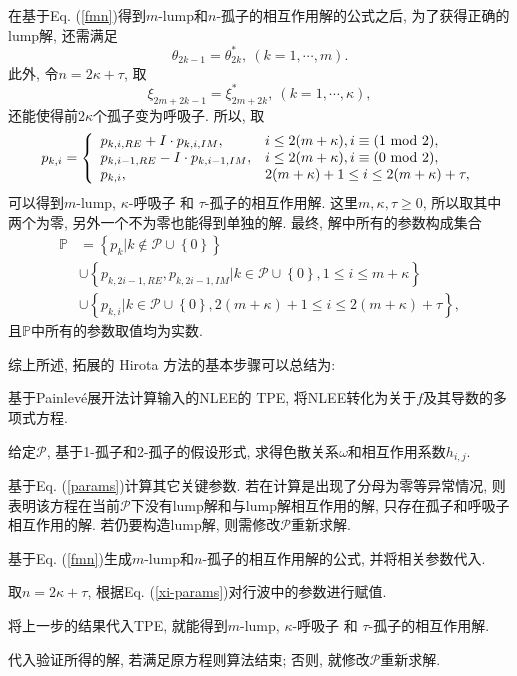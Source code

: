 \documentclass[12pt,a4paper,UTF8]{article}
\numberwithin{equation}{section}
\newcommand{\bbrace}[1]{\left\{#1\right\}}
\newcommand{\PS}{\mathcal{P}}
\renewcommand{\mod}{{\rm ~mod~}}
\newcommand{\Painleve}{Painlev{\'e}}
\newcommand{\refeqn}[1]{Eq. (\ref{#1})}
\newcommand{\MLNS}{$m$-lump和$n$-孤子的相互作用解}
\begin{document}
在基于\refeqn{fmn}得到\MLNS{}的公式之后, 为了获得正确的lump解, 还需满足
\begin{equation}
  \theta_{2k-1}=\theta_{2k}^*, ~(k=1,\cdots,m).
\end{equation}
此外, 令$n=2\kappa+\tau$, 取
\begin{equation}
  \xi_{2m+2k-1}=\xi_{2m+2k}^*, ~(k=1,\cdots,\kappa),
\end{equation}
还能使得前$2\kappa$个孤子变为呼吸子. 所以, 取
\begin{equation}
p_{k,i}=\left\{
\begin{array}{ll}
  p_{k,i,RE}+I\cdot p_{k,i,IM}, & i\le 2(m+\kappa), i\equiv(1 \mod 2),\\
  p_{k,i-1,RE}-I\cdot p_{k,i-1,IM}, & i\le 2(m+\kappa), i\equiv(0 \mod 2),\\
  p_{k,i}, & 2(m+\kappa)+1 \le i \le 2(m+\kappa)+\tau ,
\end{array}
\right.
\end{equation}
可以得到$m$-lump, $\kappa$-呼吸子 和 $\tau$-孤子的相互作用解. 这里$m,\kappa,\tau\ge 0$, 所以取其中两个为零, 另外一个不为零也能得到单独的解. 最终, 解中所有的参数构成集合
\begin{equation}
\begin{aligned}
\mathbb{P}
&=\bbrace{p_k|k\not\in \PS\cup\bbrace{0}} \\
&\cup\bbrace{p_{k,2i-1,RE},p_{k,2i-1,IM}|k\in\PS\cup\bbrace{0},1\le i \le m+\kappa} \\
&\cup\bbrace{p_{k,i}|k\in\PS\cup\bbrace{0},2(m+\kappa)+1 \le i \le 2(m+\kappa)+\tau},
\end{aligned}
\label{xi-params}
\end{equation}
且$\mathbb P$中所有的参数取值均为实数. 

综上所述, 拓展的 Hirota 方法的基本步骤可以总结为: 
\begin{compactenum}[Step 1.]
\item 基于\Painleve{}展开法计算输入的NLEE的 TPE, 将NLEE转化为关于$f$及其导数的多项式方程. 
\item 给定$\PS$, 基于1-孤子和2-孤子的假设形式, 求得色散关系$\omega$和相互作用系数$h_{i,j}$.
\item 基于\refeqn{params}计算其它关键参数. 若在计算是出现了分母为零等异常情况, 则表明该方程在当前$\PS$下没有lump解和与lump解相互作用的解, 只存在孤子和呼吸子相互作用的解. 若仍要构造lump解, 则需修改$\PS$重新求解. 
\item 基于\refeqn{fmn}生成\MLNS{}的公式, 并将相关参数代入. 
\item 取$n=2\kappa+\tau$, 根据\refeqn{xi-params}对行波中的参数进行赋值.
\item 将上一步的结果代入TPE, 就能得到$m$-lump, $\kappa$-呼吸子 和 $\tau$-孤子的相互作用解.
\item 代入验证所得的解, 若满足原方程则算法结束; 否则, 就修改$\PS$重新求解. 
\end{compactenum}
\end{document}
